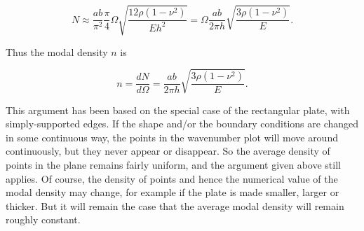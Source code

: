   $$N \approx \dfrac{ab}{\pi^2} \dfrac{\pi}{4} \Omega \sqrt{\dfrac{12 \rho 
  (1-\nu^2)}{Eh^2}} = \Omega \dfrac{ab}{2 \pi h} \sqrt{\dfrac{3 \rho 
  (1-\nu^2)}{E}} . \tag{5}$$ 

  Thus the modal density $n$ is 

  $$n=\dfrac{dN}{d \Omega} = \dfrac{ab}{2 \pi h} \sqrt{\dfrac{3 \rho 
  (1-\nu^2)}{E}} . \tag{6}$$ 

  This argument has been based on the special case of the rectangular plate, 
  with simply-supported edges. If the shape and/or the boundary conditions are 
  changed in some continuous way, the points in the wavenumber plot will move 
  around continuously, but they never appear or disappear. So the average 
  density of points in the plane remains fairly uniform, and the argument given 
  above still applies. Of course, the density of points and hence the numerical 
  value of the modal density may change, for example if the plate is made 
  smaller, larger or thicker. But it will remain the case that the average 
  modal density will remain roughly constant. 